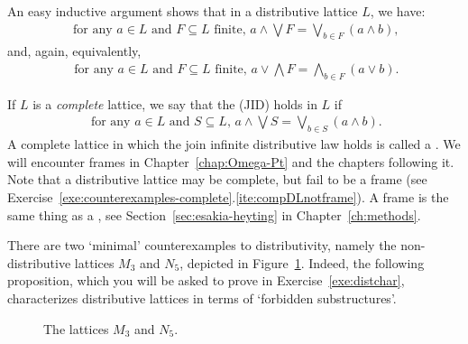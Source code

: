 An easy inductive argument shows that in a distributive lattice $L$, we have:
\begin{align*}
\text{ for any $a \in L$ and $F \subseteq L$ finite, } a \wedge \bigvee F = \bigvee_{b \in F} (a \wedge b),
\end{align*}
and, again, equivalently,
\begin{align*}
\text{ for any $a \in L$ and $F \subseteq L$ finite, } a \vee \bigwedge F = \bigwedge_{b \in F} (a \vee b).
\end{align*}

If $L$ is a \emph{complete} lattice, we say that the  (JID) holds in $L$ if
\begin{align} \label{eq:JID}
\text{ for any $a \in L$ and $S \subseteq L$, } a \wedge \bigvee S = \bigvee_{b \in S} (a \wedge b).
\end{align}
A complete lattice in which the join infinite distributive law holds is called a . We will encounter frames in Chapter~\ref{chap:Omega-Pt} and the chapters following it. Note that a distributive lattice may be complete, but fail to be a frame (see Exercise~\ref{exe:counterexamples-complete}.\ref{ite:compDLnotframe}). A frame is the same thing as a , see Section~\ref{sec:esakia-heyting} in Chapter~\ref{ch:methods}.

There are two `minimal' counterexamples to distributivity, namely the non-distributive lattices $M_3$ and $N_5$, depicted in Figure~\ref{fig:nondist}. Indeed, the following proposition, which you will be asked to prove in Exercise~\ref{exe:distchar}, characterizes distributive lattices in terms of `forbidden substructures'.
\begin{figure}[htp]
\begin{center}
\vspace{-5mm}
\end{center}
\caption{The lattices $M_3$ and $N_5$.}
\label{fig:nondist}
\end{figure}

